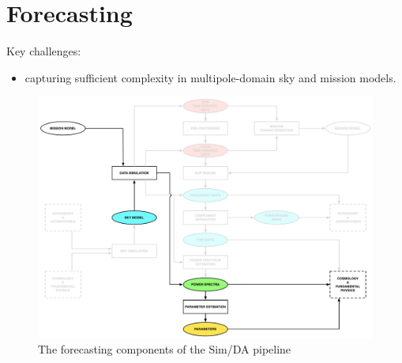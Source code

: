 
\section{Forecasting}

Key challenges: 
\begin{itemize}
\item capturing sufficient complexity in multipole-domain sky and mission models.
\end{itemize}

\begin{figure}[htbp]
\centering
\includegraphics[width=1\textwidth]{Analysis/fc}
\caption{The forecasting components of the Sim/DA pipeline}
\label{default}

\end{figure}
